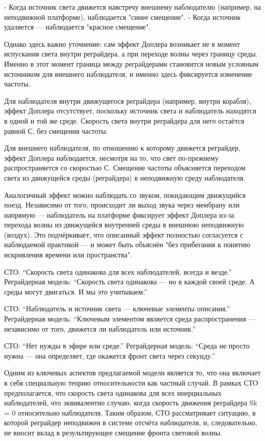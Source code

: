\documentclass[12pt]{article}
\begin{document}
- Когда источник света движется навстречу внешнему наблюдателю (например, на неподвижной платформе), наблюдается "синее смещение".
- Когда источник удаляется — наблюдается "красное смещение".

Однако здесь важно уточнение: сам эффект Доплера возникает не в момент испускания света внутри реграйдера, а при переходе волны через границу среды. Именно в этот момент граница между реграйдерами становится новым условным источником для внешнего наблюдателя, и именно здесь фиксируется изменение частоты.

Для наблюдателя внутри движущегося реграйдера (например, внутри корабля), эффект Доплера отсутствует, поскольку источник света и наблюдатель находятся в одной и той же среде. Скорость света внутри реграйдера для него остаётся равной С, без смещения частоты.

Для внешнего наблюдателя, по отношению к которому движется реграйдер, эффект Доплера наблюдается, несмотря на то, что свет по-прежнему распространяется со скоростью С. Смещение частоты объясняется переходом света из движущейся среды (реграйдера) в неподвижную среду наблюдателя.

Аналогичный эффект можно наблюдать со звуком, покидающим движущийся поезд. Независимо от того, происходит ли выход звука через мембрану или напрямую — наблюдатель на платформе фиксирует эффект Доплера из-за перехода волны из движущейся внутренней среды в внешнюю неподвижную (воздух). Это подчёркивает, что описанный эффект полностью согласуется с наблюдаемой практикой — и может быть объяснён "без прибегания к понятию искривления времени или пространства".

СТО: “Скорость света одинакова для всех наблюдателей, всегда и везде.”
Реграйдерная модель: “Скорость света одинакова — но в каждой своей среде. А среды могут двигаться. И мы это учитываем.”

СТО: “Наблюдатель и источник света — ключевые элементы описания.”
Реграйдерная модель: “Ключевым элементом является среда распространения — независимо от того, движется ли наблюдатель или источник.”

СТО: “Нет нужды в эфире или среде.”
Реграйдерная модель: “Среда не просто нужна — она определяет, где окажется фронт света через секунду.”

Одним из ключевых аспектов предлагаемой модели является то, что она включает в себя специальную теорию относительности как частный случай. В рамках СТО предполагается, что скорость света одинакова для всех инерциальных наблюдателей, что эквивалентно случаю, когда скорость движения реграйдера Sk = 0 относительно наблюдателя. Таким образом, СТО рассматривает ситуацию, в которой реграйдер неподвижен в системе отсчёта наблюдателя, и, следовательно, не вносит вклад в результирующее смещение фронта световой волны.
\end{document}
